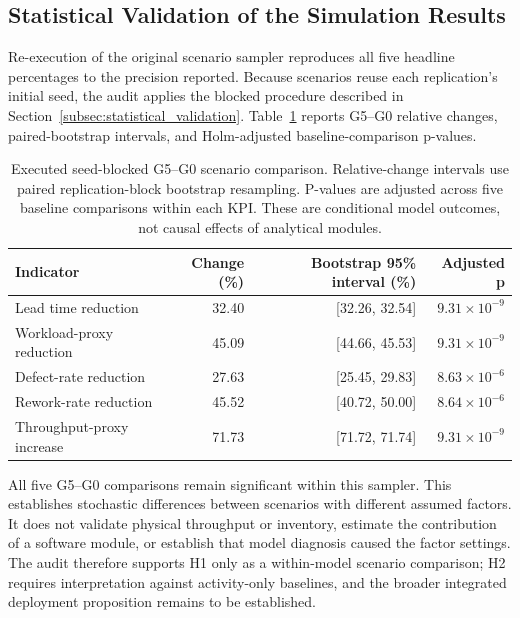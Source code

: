 \documentclass[pdflatex,iicol,Numbered,sn-basic]{sn-jnl}
\begin{document}
\subsection{Statistical Validation of the Simulation Results}
\label{subsec:statistical_results}

Re-execution of the original scenario sampler reproduces all five headline percentages to the precision reported. Because scenarios reuse each replication's initial seed, the audit applies the blocked procedure described in Section~\ref{subsec:statistical_validation}. Table~\ref{tab:paired_statistics} reports G5--G0 relative changes, paired-bootstrap intervals, and Holm-adjusted baseline-comparison p-values.

\begin{table}[t]
\caption{Executed seed-blocked G5--G0 scenario comparison. Relative-change intervals use paired replication-block bootstrap resampling. P-values are adjusted across five baseline comparisons within each KPI. These are conditional model outcomes, not causal effects of analytical modules.}
\label{tab:paired_statistics}
\centering\small
\begin{tabular}{lrrr}
\toprule
Indicator & Change (\%) & Bootstrap 95\% interval (\%) & Adjusted p\\
\midrule
Lead time reduction & 32.40 & [32.26, 32.54] & $ 9.31 \times 10^{-9} $ \\
Workload-proxy reduction & 45.09 & [44.66, 45.53] & $ 9.31 \times 10^{-9} $ \\
Defect-rate reduction & 27.63 & [25.45, 29.83] & $ 8.63 \times 10^{-6} $ \\
Rework-rate reduction & 45.52 & [40.72, 50.00] & $ 8.64 \times 10^{-6} $ \\
Throughput-proxy increase & 71.73 & [71.72, 71.74] & $ 9.31 \times 10^{-9} $ \\
\bottomrule
\end{tabular}
\end{table}

All five G5--G0 comparisons remain significant within this sampler. This establishes stochastic differences between scenarios with different assumed factors. It does not validate physical throughput or inventory, estimate the contribution of a software module, or establish that model diagnosis caused the factor settings. The audit therefore supports H1 only as a within-model scenario comparison; H2 requires interpretation against activity-only baselines, and the broader integrated deployment proposition remains to be established.
\end{document}
